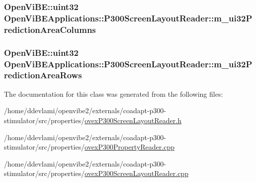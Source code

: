 \label{classOpenViBEApplications_1_1P300ScreenLayoutReader_a4b19abd34cc0f6601250c54e3568b199}
\hypertarget{classOpenViBEApplications_1_1P300ScreenLayoutReader_af6b9886b7b0a9a1cd82c38e7b1a0c2fc}{
\subsubsection[{m\_\-ui32PredictionAreaColumns}]{\setlength{\rightskip}{0pt plus 5cm}OpenViBE::uint32 {\bf OpenViBEApplications::P300ScreenLayoutReader::m\_\-ui32PredictionAreaColumns}}}
\label{classOpenViBEApplications_1_1P300ScreenLayoutReader_af6b9886b7b0a9a1cd82c38e7b1a0c2fc}
\hypertarget{classOpenViBEApplications_1_1P300ScreenLayoutReader_a35c86e8f895fa80e20d02fac37475f8c}{
\subsubsection[{m\_\-ui32PredictionAreaRows}]{\setlength{\rightskip}{0pt plus 5cm}OpenViBE::uint32 {\bf OpenViBEApplications::P300ScreenLayoutReader::m\_\-ui32PredictionAreaRows}}}
\label{classOpenViBEApplications_1_1P300ScreenLayoutReader_a35c86e8f895fa80e20d02fac37475f8c}


The documentation for this class was generated from the following files:\begin{DoxyCompactItemize}
\item 
/home/ddevlami/openvibe2/externals/coadapt-\/p300-\/stimulator/src/properties/\hyperlink{ovexP300ScreenLayoutReader_8h}{ovexP300ScreenLayoutReader.h}\item 
/home/ddevlami/openvibe2/externals/coadapt-\/p300-\/stimulator/src/properties/\hyperlink{ovexP300PropertyReader_8cpp}{ovexP300PropertyReader.cpp}\item 
/home/ddevlami/openvibe2/externals/coadapt-\/p300-\/stimulator/src/properties/\hyperlink{ovexP300ScreenLayoutReader_8cpp}{ovexP300ScreenLayoutReader.cpp}\end{DoxyCompactItemize}
